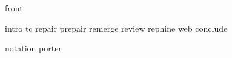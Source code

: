 \documentclass[a4paper,twoside,openright,11pt,oldfontcommands]{memoir}
\begin{document}
\DoubleSpacing  %

\frontmatter
{front}

\tableofcontents
\cleartorecto

\listoffigures
\cleartorecto

\listoftables
\cleartorecto

\listofalgs
\cleartorecto

\pagestyle{rwanpage}
\mainmatter

{intro}
{tc}
{repair}
{prepair}
{remerge}
{review}
{rephine}
{web}
{conclude}

\appendix
{notation}
{porter}

\backmatter
%
%
\printbibliography

\end{document}
